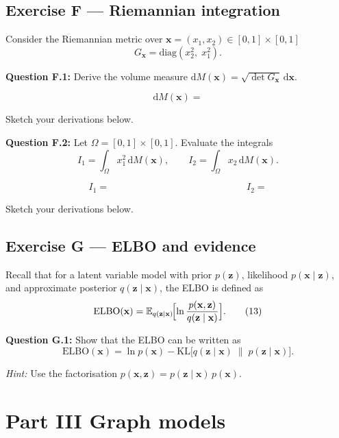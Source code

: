 \documentclass[12pt,a4paper]{article}
\newcommand{\KL}{\mathrm{KL}}
\newcommand{\E}{\mathbb{E}}
\newcommand{\ELBO}{\mathrm{ELBO}}
\begin{document}
\newpage
\subsection*{Exercise F --- Riemannian integration}

Consider the Riemannian metric over $\mathbf{x}=(x_1,x_2)\in[0,1]\times[0,1]$
\[
  G_{\mathbf{x}} = \mathrm{diag}(x_2^2,\; x_1^2). \tag{12}
\]

\textbf{Question F.1:} Derive the volume measure $\mathrm{d}M(\mathbf{x})=\sqrt{\det G_{\mathbf{x}}}\,\mathrm{d}\mathbf{x}$.

\[
  \mathrm{d}M(\mathbf{x}) =
\]

Sketch your derivations below.

\vspace{3cm}

\textbf{Question F.2:} Let $\Omega=[0,1]\times[0,1]$.  Evaluate the integrals
\[
  I_1 = \int_\Omega x_1^2\,\mathrm{d}M(\mathbf{x}), \qquad
  I_2 = \int_\Omega x_2\,\mathrm{d}M(\mathbf{x}).
\]

\[
  I_1 = \hspace{6cm} I_2 =
\]

Sketch your derivations below.

\vspace{5cm}

\newpage
\subsection*{Exercise G --- ELBO and evidence}

Recall that for a latent variable model with prior $p(\mathbf{z})$, likelihood $p(\mathbf{x}\mid\mathbf{z})$,
and approximate posterior $q(\mathbf{z}\mid\mathbf{x})$, the ELBO is defined as
\[
  \ELBO(\mathbf{x}) = \E_{q(\mathbf{z}\mid\mathbf{x})}\!\Bigl[\ln\frac{p(\mathbf{x},\mathbf{z})}{q(\mathbf{z}\mid\mathbf{x})}\Bigr]. \tag{13}
\]

\textbf{Question G.1:} Show that the ELBO can be written as
\[
  \ELBO(\mathbf{x}) = \ln p(\mathbf{x}) - \KL\!\bigl[q(\mathbf{z}\mid\mathbf{x})\;\|\;p(\mathbf{z}\mid\mathbf{x})\bigr]. \tag{14}
\]

\emph{Hint:} Use the factorisation $p(\mathbf{x},\mathbf{z}) = p(\mathbf{z}\mid\mathbf{x})\,p(\mathbf{x})$.

\vspace{7cm}

\newpage
\section*{Part III \quad Graph models}
\end{document}
